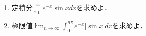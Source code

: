 \documentclass[../../main.tex]{subfiles}
\begin{document}
\begin{enumerate}
  \item 定積分$\displaystyle \int_0^\pi e^{-x} \sin x dx$を求めよ．
  \item 極限値$\displaystyle \lim_{n\to\infty} \int_0^{n\pi} e^{-x} |\sin x| dx$を求めよ．
\end{enumerate}
\end{document}
